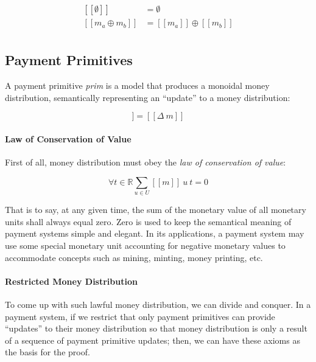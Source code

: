 \begin{equation}
    \begin{split}
        [\![\emptyset]\!] &= \emptyset \\
        [\![m_a \oplus m_b]\!] &= [\![m_a]\!] \oplus [\![m_b]\!] \\
    \end{split}
\end{equation}

\subsection{Payment Primitives}

A payment primitive \textit{prim} is a model that produces a monoidal money distribution,
semantically representing an ``update'' to a money distribution:

\begin{equation}
    [\![prim]\!] = [\![\Delta\ m]\!]
\end{equation}

\paragraph{Law of Conservation of Value}

First of all, money distribution must obey the \textit{law of conservation of value}:

\begin{equation}
    \forall t \in \mathbb{R} {\displaystyle \sum_{u \in U} [\![m]\!]\ u\ t = 0}
\end{equation}

That is to say, at any given time, the sum of the monetary value of all monetary units shall always
equal zero. Zero is used to keep the semantical meaning of payment systems simple and elegant. In
its applications, a payment system may use some special monetary unit accounting for negative
monetary values to accommodate concepts such as mining, minting, money printing, etc.

\paragraph{Restricted Money Distribution}

To come up with such lawful money distribution, we can divide and conquer. In a payment system, if
we restrict that only payment primitives can provide ``updates'' to their money distribution so that
money distribution is only a result of a sequence of payment primitive updates; then, we can have
these axioms as the basis for the proof.

